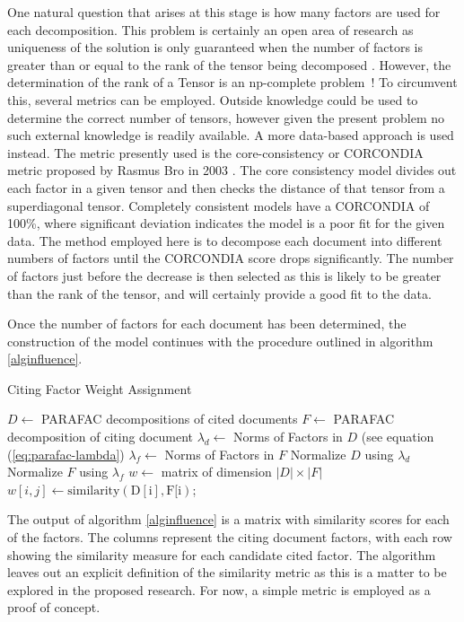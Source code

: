 \documentclass{article}
\begin{document}
One natural question that arises at this stage is how many factors are
used for each decomposition. This problem is certainly an open area of
research as uniqueness of the solution is only guaranteed when the
number of factors is greater than or equal to the rank of the tensor
being decomposed \cite{harshman1970}.  However, the determination of
the rank of a Tensor is an np-complete problem~\cite{haastad1990}!  To
circumvent this, several metrics can be employed.  Outside knowledge
could be used to determine the correct number of tensors, however
given the present problem no such external knowledge is readily
available.  A more data-based approach is used instead.  The metric
presently used is the core-consistency or CORCONDIA metric proposed by
Rasmus Bro in 2003 \cite{bro2003}.  The core consistency model divides
out each factor in a given tensor and then checks the distance of that
tensor from a superdiagonal tensor.  Completely consistent models have
a CORCONDIA of 100\%, where significant deviation indicates the model
is a poor fit for the given data.  The method employed here is to
decompose each document into different numbers of factors until the
CORCONDIA score drops significantly.  The number of factors just
before the decrease is then selected as this is likely to be greater
than the rank of the tensor, and will certainly provide a good fit to
the data.

Once the number of factors for each document has been determined, the
construction of the model continues with the procedure outlined in
algorithm \ref{alginfluence}.  

\begin{algorithm}
    \caption{Citing Factor Weight Assignment}
    \label{alginfluence}
    $D \leftarrow$ PARAFAC decompositions of cited documents\;
    $F \leftarrow$ PARAFAC decomposition of citing document\;
    $\lambda_d \leftarrow $ Norms of Factors in $D$ (see equation
    (\ref{eq:parafac-lambda})\;
    $\lambda_f \leftarrow $ Norms of Factors in $F$\;
    Normalize $D$ using $\lambda_d$\;
    Normalize $F$ using $\lambda_f$\;
    $w \leftarrow $ matrix of dimension $|D| \times |F|$\;
     {
         {
            $w[i,j] \leftarrow \mathrm{similarity(D[i], F[i)}$;
        }
    }
\end{algorithm}

The output of algorithm \ref{alginfluence} is a matrix with similarity
scores for each of the factors. The columns represent the citing
document factors, with each row showing the similarity measure for
each candidate cited factor.  The algorithm leaves out an explicit
definition of the similarity metric as this is a matter to be explored
in the proposed research. For now, a simple metric is employed as
a proof of concept.  
\end{document}
